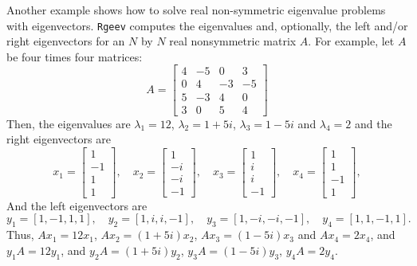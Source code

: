 \documentclass[12pt]{article}
\begin{document}
Another example shows how to solve real non-symmetric eigenvalue problems with eigenvectors. {\tt Rgeev} computes the eigenvalues and, optionally, the left and/or right eigenvectors  for an $N$ by $N$ real nonsymmetric matrix $A$.
For example, let $A$ be four times four matrices:
\[
A=\left[\begin{array}{rrrr}4 & -5 & 0 & 3 \\ 0 & 4 & -3 & -5 \\ 5 & -3 & 4 & 0 \\ 3 & 0 & 5 & 4\end{array}\right]
\]
Then, the eigenvalues are $\lambda_1= 12$, $\lambda_2= 1+5i$, $\lambda_3 = 1-5i$ and $\lambda_4=2$ and the right eigenvectors are
\[
{x}_{1}=\left[\begin{array}{r}1 \\ -1 \\ 1 \\ 1\end{array}\right], \quad {x}_{2}=\left[\begin{array}{c}1 \\ -i \\ -i \\ -1\end{array}\right], \quad {x}_{3}=\left[\begin{array}{c}1 \\ i \\ i \\ -1\end{array}\right], \quad {x}_{4}=\left[\begin{array}{c}1 \\ 1 \\ -1 \\ 1\end{array}\right],
\]
And the left eigenvectors are
\[
{y}_{1}=[1,-1,1,1], \quad {y}_{2}=[1, i, i,-1], \quad {y}_{3}=[1,-i,-i,-1], \quad {y}_{4}=[1,1,-1,1].
\]
Thus, $Ax_1 = 12 x_1$, $Ax_2 = (1+5i) x_2$, $Ax_3 = (1-5i) x_3$ and $Ax_4 = 2 x_4$,
and $y_1 A = 12 y_1$, and $y_2 A = (1+5i) y_2$, $y_3 A = (1-5i) y_3$, $y_4 A = 2 y_4$.
\end{document}
